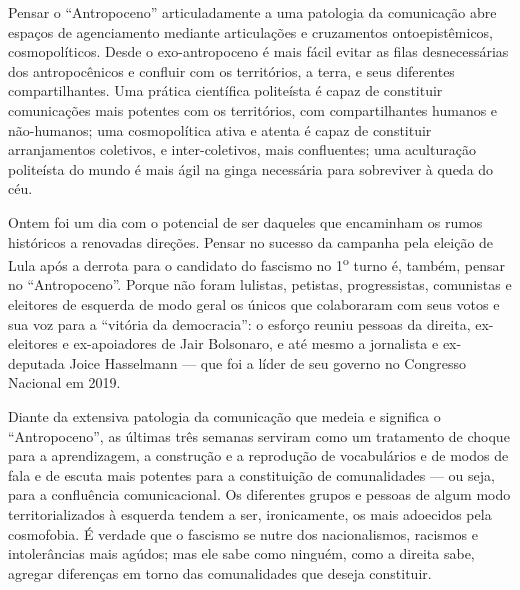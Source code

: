 Pensar o \enquote{Antropoceno} articuladamente a uma patologia da comunicação abre espaços de agenciamento mediante articulações e cruzamentos ontoepistêmicos, cosmopolíticos. Desde o exo-antropoceno é mais fácil evitar as filas desnecessárias dos antropocênicos e confluir com os territórios, a terra, e seus diferentes compartilhantes. Uma prática científica politeísta é capaz de constituir comunicações mais potentes com os territórios, com compartilhantes humanos e não-humanos; uma cosmopolítica ativa e atenta é capaz de constituir arranjamentos coletivos, e inter-coletivos, mais confluentes; uma aculturação politeísta do mundo é mais ágil na ginga necessária para sobreviver à queda do céu.


Ontem foi um dia com o potencial de ser daqueles que encaminham os rumos históricos a renovadas direções. Pensar no sucesso da campanha pela eleição de Lula após a derrota para o candidato do fascismo no 1\textsuperscript{o} turno é, também, pensar no \enquote{Antropoceno}. Porque não foram lulistas, petistas, progressistas, comunistas e eleitores de esquerda de modo geral os únicos que colaboraram com seus votos e sua voz para a \enquote{vitória da democracia}: o esforço reuniu pessoas da direita, ex-eleitores e ex-apoiadores de Jair Bolsonaro, e até mesmo a jornalista e ex-deputada Joice Hasselmann --- que foi a líder de seu governo no Congresso Nacional em 2019.

Diante da extensiva patologia da comunicação que medeia e significa o \enquote{Antropoceno}, as últimas três semanas serviram como um tratamento de choque para a aprendizagem, a construção e a reprodução de vocabulários e de modos de fala e de escuta mais potentes para a constituição de comunalidades --- ou seja, para a confluência comunicacional. Os diferentes grupos e pessoas de algum modo territorializados à esquerda tendem a ser, ironicamente, os mais adoecidos pela cosmofobia. É verdade que o fascismo se nutre dos nacionalismos, racismos e intolerâncias mais agúdos; mas ele sabe como ninguém, como a direita sabe, agregar diferenças em torno das comunalidades que deseja constituir.

